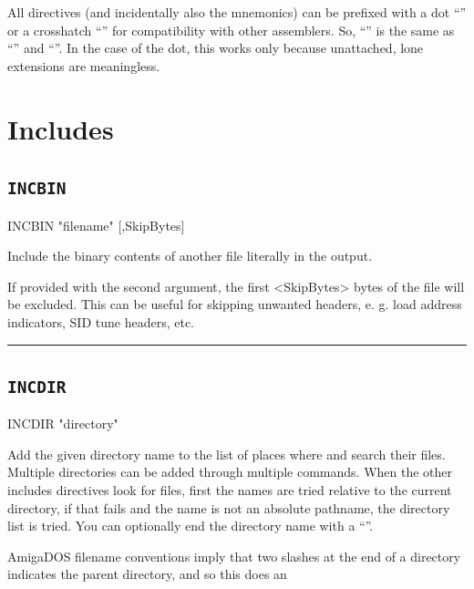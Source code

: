 All directives (and incidentally also the mnemonics) can be prefixed with a dot ``'' or a crosshatch ``\mono{\#}'' for compatibility with other assemblers. So, ``'' is the same as ``'' and ``''. In the case of the dot, this works only because unattached, lone  extensions are meaningless.

\section{Includes}
\subsection{\texttt{INCBIN}}
\label{pseudoop:incbin}

\begin{usage}
  INCBIN "filename" [,SkipBytes]
\end{usage}

Include the binary contents of another file literally in the output.

If provided with the second argument, the first <SkipBytes> bytes of the file will be excluded. This can be useful for skipping unwanted headers, e. g. load address indicators, SID tune headers, etc.\\
\hrule

\subsection{\texttt{INCDIR}}
\label{pseudoop:incdir}

\begin{usage}
  INCDIR "directory"
\end{usage}

Add the given directory name to the list of places where
 and  search their files. Multiple directories can be added through multiple  commands. When the other includes directives look for files, first the names are tried relative to the current directory, if that fails and
the name is not an absolute pathname, the directory list is tried.
You can optionally end the directory name with a ``\mono{/}''. 

{\color{todo}AmigaDOS filename conventions imply that two slashes at the end of a directory indicates the parent directory, and so this does an ~}
	
